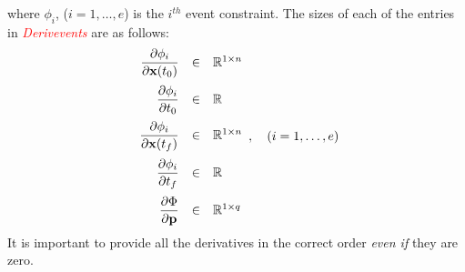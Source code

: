 \documentclass[10pt]{article}
\newcommand{\slred}[1]{\textcolor{red}{\sl #1}}
\begin{document}
where $\phi_i$, ($i = 1,\ldots,e$) is the $i^{th}$ event constraint.
The sizes of each of the entries in \slred{Derivevents} are as
follows:
\begin{equation}
 \begin{array}{rcl}
\displaystyle   \pd{\phi_i}{\bfx(t_0)} & \in & \mathbb{R}^{1\times n}\vspace{6pt}\\
\displaystyle  \pd{\phi_i}{t_0} & \in & \mathbb{R} \vspace{6pt}\\ 
\displaystyle   \pd{\phi_i}{\bfx(t_f)} & \in & \mathbb{R}^{1\times n}\vspace{6pt}\\
\displaystyle  \pd{\phi_i}{t_f} & \in & \mathbb{R}\vspace{6pt}\\ 
\displaystyle  \pd{\Phi}{\bfp} & \in & \mathbb{R}^{1\times q}
\end{array}, \quad (i=1,\ldots,e)
\end{equation} 
It is important to provide all the derivatives in the correct order {\em even if} they are zero.
\end{document}
